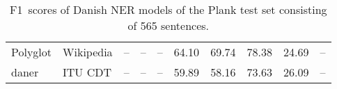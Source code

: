 \documentclass[main.tex]{subfiles}
\begin{document}
\begin{table}[H]
\begin{center}
\begin{tabular}{l l | c c c c | c c c c}
                        Polyglot      & Wikipedia      & --             & --             & --             & 64.10                        & 69.74 & 78.38 & 24.69 & -- \\
                        daner         & ITU CDT        & --             & --             & --             & 59.89                        & 58.16 & 73.63 & 26.09 & -- \\
                \end{tabular}
        \end{center}
        \caption{F1\pro\ scores of Danish NER models of the Plank test set consisting of 565 sentences.}
        \label{tab:Plank}
\end{table}


\end{document}
